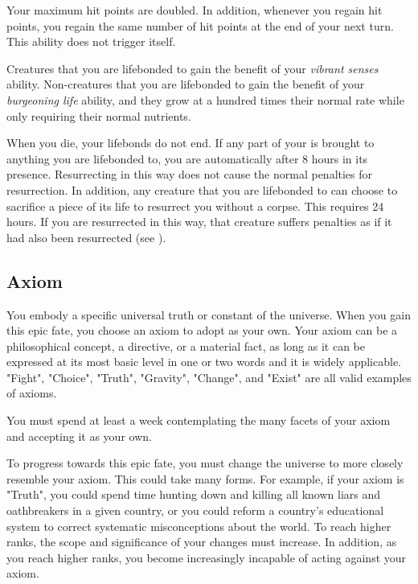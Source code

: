        Your maximum hit points are doubled.
      In addition, whenever you regain hit points, you regain the same number of hit points at the end of your next turn.
      This ability does not trigger itself.

       Creatures that you are lifebonded to gain the benefit of your \textit{vibrant senses} ability.
      Non-creatures that you are lifebonded to gain the benefit of your \textit{burgeoning life} ability, and they grow at a hundred times their normal rate while only requiring their normal nutrients.

       When you die, your lifebonds do not end.
      If any part of your  is brought to anything you are lifebonded to, you are automatically  after 8 hours in its presence.
      Resurrecting in this way does not cause the normal penalties for resurrection.
      In addition, any creature that you are lifebonded to can choose to sacrifice a piece of its life to resurrect you without a corpse.
      This requires 24 hours.
      If you are resurrected in this way, that creature suffers penalties as if it had also been resurrected (see ).

  \subsection{Axiom}
    You embody a specific universal truth or constant of the universe.
    When you gain this epic fate, you choose an axiom to adopt as your own.
    Your axiom can be a philosophical concept, a directive, or a material fact, as long as it can be expressed at its most basic level in one or two words and it is widely applicable.
    "Fight", "Choice", "Truth", "Gravity", "Change", and "Exist" are all valid examples of axioms.

     You must spend at least a week contemplating the many facets of your axiom and accepting it as your own.

     To progress towards this epic fate, you must change the universe to more closely resemble your axiom.
    This could take many forms.
    For example, if your axiom is "Truth", you could spend time hunting down and killing all known liars and oathbreakers in a given country, or you could reform a country's educational system to correct systematic misconceptions about the world.
    To reach higher ranks, the scope and significance of your changes must increase.
    In addition, as you reach higher ranks, you become increasingly incapable of acting against your axiom.

